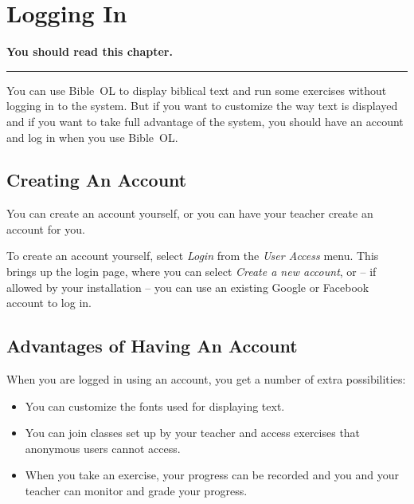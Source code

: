 \documentclass[11pt,oneside,a4paper]{memoir}
\begin{document}
\FloatBlock


\FloatBlock



\chapter{Logging In}\label{chap-logging-in}

\textbf{You should read this chapter.}
\plainbreak{3}

You can use Bible~OL to display biblical text and run some exercises without logging in to the
system. But if you want to customize the way text is displayed and if you want to take full
advantage of the system, you should have an account and log in when you use Bible~OL.

\section{Creating An Account}

You can create an account yourself, or you can have your teacher create an account for you.

To create an account yourself, select \emph{Login} from the \emph{User Access} menu. This brings up
the login page, where you can select \emph{Create a new account}, or -- if allowed by your
installation -- you can use an existing Google or Facebook account to log in.


\section{Advantages of Having An Account}

When you are logged in using an account, you get a number of extra possibilities:

\begin{itemize}
\item You can customize the fonts used for displaying text.
\item You can join classes set up by your teacher and access exercises that anonymous users cannot
  access.
\item When you take an exercise, your progress can be recorded and you and your teacher can monitor
  and grade your progress.
\end{itemize}
\end{document}
